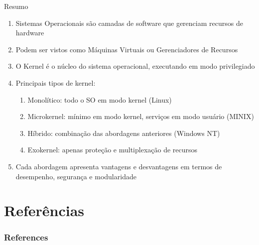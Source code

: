 \documentclass{beamer}
\begin{document}
\begin{frame}{Resumo}
\begin{enumerate}
    \vfill \item Sistemas Operacionais são camadas de software que gerenciam recursos de hardware
    \vfill \item Podem ser vistos como Máquinas Virtuais ou Gerenciadores de Recursos
    \vfill \item O Kernel é o núcleo do sistema operacional, executando em modo privilegiado
    \vfill \item Principais tipos de kernel:
    \begin{enumerate}
        \item Monolítico: todo o SO em modo kernel (Linux)
        \item Microkernel: mínimo em modo kernel, serviços em modo usuário (MINIX)
        \item Híbrido: combinação das abordagens anteriores (Windows NT)
        \item Exokernel: apenas proteção e multiplexação de recursos
    \end{enumerate}
    \vfill \item Cada abordagem apresenta vantagens e desvantagens em termos de desempenho, segurança e modularidade
\end{enumerate}
\end{frame}

\section{Referências}
\begin{frame}[t, allowframebreaks]
    \frametitle{References}
    \printbibliography
\end{frame}
\end{document}
